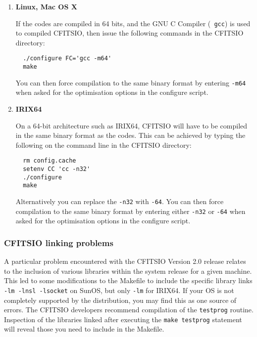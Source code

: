\documentclass[12pt,twoside]{article}
\begin{document}
\begin{enumerate}
%
\item {\bf Linux, Mac OS X}

If the \healpix codes are compiled in 64 bits, and the GNU C Compiler ({\tt
gcc}) is used to compiled CFITSIO, then issue the following commands in the
CFITSIO directory:

\begin{verbatim}
  ./configure FC='gcc -m64'
  make
\end{verbatim}

You can
then force compilation to the same binary format by entering
\texttt{-m64} when asked for the optimisation options in the
\healpix configure script.

\item {\bf IRIX64}

On a 64-bit architecture such as IRIX64, CFITSIO will have to be
compiled in the same  binary format as the \healpix codes.
This can be achieved by typing the
following on the
command line in the CFITSIO directory:
 
\begin{verbatim}
  rm config.cache    
  setenv CC 'cc -n32'
  ./configure
  make
\end{verbatim}

Alternatively you can replace the \texttt{-n32} with \texttt{-64}. You can
then force compilation to the same binary format by entering either
\texttt{-n32} or \texttt{-64} when asked for the optimisation options in the
\healpix configure script.
%
\end{enumerate}

\subsubsection*{CFITSIO linking problems}

A particular problem encountered with the CFITSIO Version 2.0 release relates
to the inclusion of various libraries within the system release for a given
machine. This led to some modifications to the Makefile to include the specific
library links \texttt{-lm -lnsl -lsocket} on SunOS, but only \texttt{-lm} for IRIX64.
If your OS is not completely supported by the distribution, you may find this
as one source of errors. The CFITSIO developers recommend compilation of the
\texttt{testprog} routine. Inspection of the libraries linked after executing the
\texttt{make testprog} statement will reveal those you need to include in the
Makefile.
\end{document}
